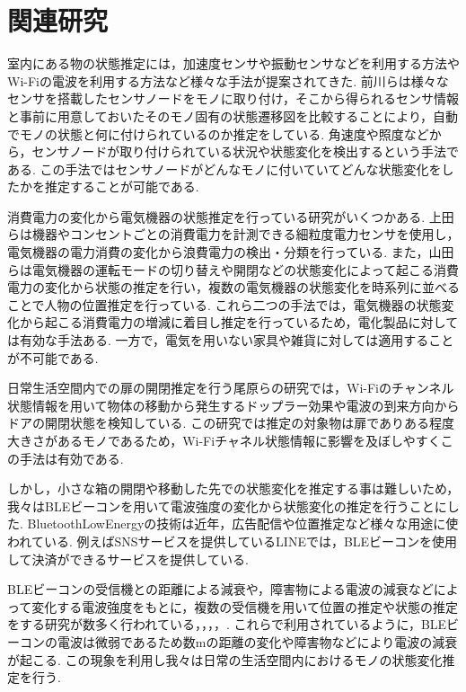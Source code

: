 \documentclass[Japanese]{dicomopapers}
\begin{document}
\section{関連研究}
室内にある物の状態推定には，加速度センサや振動センサなどを利用する方法やWi-Fiの電波を利用する方法など様々な手法が提案されてきた.
前川ら\cite{TagAndThink}は様々なセンサを搭載したセンサノードをモノに取り付け，そこから得られるセンサ情報と事前に用意しておいたそのモノ固有の状態遷移図を比較することにより，自動でモノの状態と何に付けられているのか推定をしている.
角速度や照度などから，センサノードが取り付けられている状況や状態変化を検出するという手法である.
この手法ではセンサノードがどんなモノに付いていてどんな状態変化をしたかを推定することが可能である.


消費電力の変化から電気機器の状態推定を行っている研究がいくつかある.
上田ら\cite{sairyu}は機器やコンセントごとの消費電力を計測できる細粒度電力センサを使用し，電気機器の電力消費の変化から浪費電力の検出・分類を行っている.
また，山田ら\cite{energy}は電気機器の運転モードの切り替えや開閉などの状態変化によって起こる消費電力の変化から状態の推定を行い，複数の電気機器の状態変化を時系列に並べることで人物の位置推定を行っている.
これら二つの手法では，電気機器の状態変化から起こる消費電力の増減に着目し推定を行っているため，電化製品に対しては有効な手法ある.
一方で，電気を用いない家具や雑貨に対しては適用することが不可能である.


日常生活空間内での扉の開閉推定を行う尾原ら\cite{WifiChannel}の研究では，Wi-Fiのチャンネル状態情報を用いて物体の移動から発生するドップラー効果や電波の到来方向からドアの開閉状態を検知している.
この研究では推定の対象物は扉でありある程度大きさがあるモノであるため，Wi-Fiチャネル状態情報に影響を及ぼしやすくこの手法は有効である.

しかし，小さな箱の開閉や移動した先での状態変化を推定する事は難しいため，我々はBLEビーコンを用いて電波強度の変化から状態変化の推定を行うことにした.
BluetoothLowEnergyの技術は近年，広告配信や位置推定など様々な用途に使われている.
例えばSNSサービスを提供しているLINEでは，BLEビーコンを使用して決済ができるサービスを提供している.\cite{bleUse}



BLEビーコンの受信機との距離による減衰や，障害物による電波の減衰などによって変化する電波強度をもとに，複数の受信機を用いて位置の推定や状態の推定をする研究が数多く行われている\cite{IoMT}，\cite{tandem}，\cite{blespot}，\cite{LANgate}，\cite{en-door}.
これらで利用されているように，BLEビーコンの電波は微弱であるため数mの距離の変化や障害物などにより電波の減衰が起こる.
この現象を利用し我々は日常の生活空間内におけるモノの状態変化推定を行う.
\end{document}
